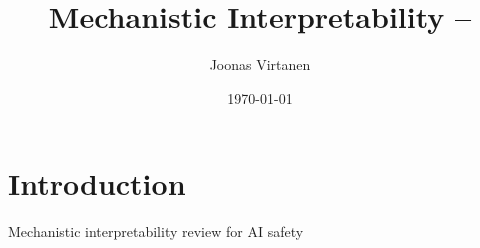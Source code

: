 \documentclass[12pt, a4paper]{article}
\title{Mechanistic Interpretability -- }
\author{Joonas Virtanen}
\date{\today}
\begin{document}
\maketitle

\section{Introduction}
Mechanistic interpretability review for AI safety \cite{bereska2024}



\printbibliography
\end{document}

